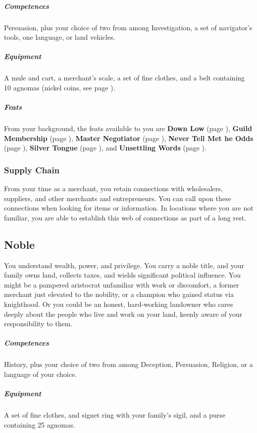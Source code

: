     \subparagraph{Competences} Persuasion, plus your choice of two from among Investigation, a set of navigator's tools, one language, or land vehicles.

    \subparagraph{Equipment} A mule and cart, a merchant's scale, a set of fine clothes, and a belt containing 10 agnomas (nickel coins, see page \pageref{sec::currency}).

    \subparagraph{Feats} From your background, the feats available to you are
    \textbf{Down Low} (page \pageref{feat::downlow}),
    \textbf{Guild Membership} (page \pageref{feat::guildmembership}),
    \textbf{Master Negotiator} (page \pageref{feat::masternegotiator}),
    \textbf{Never Tell Met he Odds} (page \pageref{feat::nevertellmetheodds}),
    \textbf{Silver Tongue} (page \pageref{feat::silvertongue}), and
    \textbf{Unsettling Words} (page \pageref{feat::unsettlingwords}).

    \subsubsection{Supply Chain} \label{feat::supplychain}
        From your time as a merchant, you retain connections with wholesalers, suppliers, and other merchants and entrepreneurs.
        You can call upon these connections when looking for items or information.
        In locations where you are not familiar, you are able to establish this web of connections as part of a long rest.

\subsection*{Noble} \label{ssec::noble}
    You understand wealth, power, and privilege.
    You carry a noble title, and your family owns land, collects taxes, and wields significant political influence.
    You might be a pampered aristocrat unfamiliar with work or discomfort, a former merchant just elevated to the nobility, or a champion who gained status via knighthood.
    Or you could be an honest, hard-working landowner who cares deeply about the people who live and work on your land, keenly aware of your responsibility to them.

    \subparagraph{Competences} History, plus your choice of two from among Deception, Persuasion, Religion, or a language of your choice.

    \subparagraph{Equipment} A set of fine clothes, and signet ring with your family's sigil, and a purse containing 25 agnomas.

